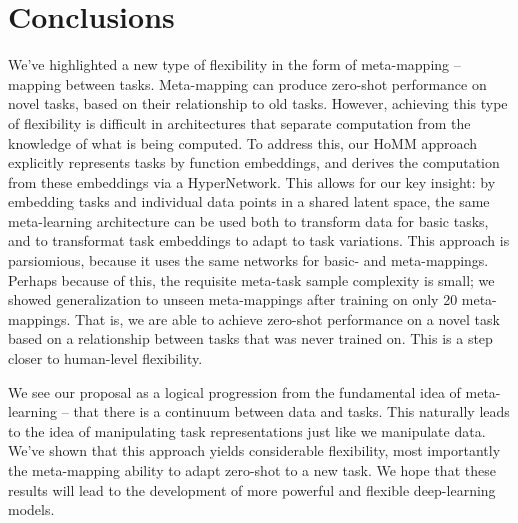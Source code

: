 \documentclass{article}
\begin{document}
\section{Conclusions}
\vspace{-0.5em} %
We've highlighted a new type of flexibility in the form of meta-mapping -- mapping between tasks. Meta-mapping can produce zero-shot performance on novel tasks, based on their relationship to old tasks. However, achieving this type of flexibility is difficult in architectures that separate computation from the knowledge of what is being computed. To address this, our HoMM approach explicitly represents tasks by function embeddings, and derives the computation from these embeddings via a HyperNetwork. This allows for our key insight: by embedding tasks and individual data points in a shared latent space, the same meta-learning architecture can be used both to transform data for basic tasks, and to transformat task embeddings to adapt to task variations. This approach is parsiomious, because it uses the same networks for basic- and meta-mappings. Perhaps because of this, the requisite meta-task sample complexity is small; we showed generalization to unseen meta-mappings after training on only 20 meta-mappings. That is, we are able to achieve zero-shot performance on a novel task based on a relationship between tasks that was never trained on. This is a step closer to human-level flexibility.\par
We see our proposal as a logical progression from the fundamental idea of meta-learning -- that there is a continuum between data and tasks. This naturally leads to the idea of manipulating task representations just like we manipulate data. We've shown that this approach yields considerable flexibility, most importantly the meta-mapping ability to adapt zero-shot to a new task. We hope that these results will lead to the development of more powerful and flexible deep-learning models. \par




\newpage

\end{document}
